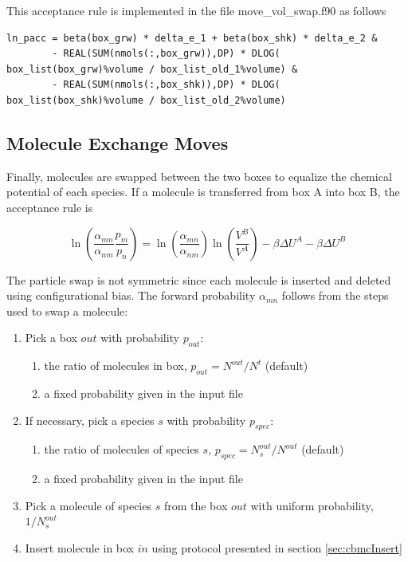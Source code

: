 This acceptance rule is implemented in the file move\_vol\_swap.f90 as follows

\begin{minipage}{\linewidth}
\begin{lstlisting}[firstnumber=402, caption=move\_vol\_swap.f90]
ln_pacc = beta(box_grw) * delta_e_1 + beta(box_shk) * delta_e_2 &
        - REAL(SUM(nmols(:,box_grw)),DP) * DLOG( box_list(box_grw)%volume / box_list_old_1%volume) &
        - REAL(SUM(nmols(:,box_shk)),DP) * DLOG( box_list(box_shk)%volume / box_list_old_2%volume)

\end{lstlisting}
\end{minipage}

\subsection{Molecule Exchange Moves} 
\label{sec:mol_swap}

Finally, molecules are swapped between the two boxes to equalize the chemical potential of each species.
If a molecule is transferred from box A into box B, the acceptance rule is

\begin{equation}
\ln \left( \frac{\alpha_{mn}}{\alpha_{nm}} \frac{p_m}{p_n} \right) = \ln \left( \frac{\alpha_{mn}}{\alpha_{nm}} \right)  \ln \left(\frac{V^B}{V^A}\right) -\beta \Delta U^A - \beta \Delta U^B
\label{eq:gemc_nvt_transfer}
\end{equation}

The particle swap is not symmetric since each molecule is inserted and deleted using configurational bias.
The forward probability $\alpha_{mn}$ follows from the steps used to swap a molecule:

\begin{enumerate}
\item Pick a box $out$ with probability $p_{out}$:
	\begin{enumerate}
	\item the ratio of molecules in box, $p_{out} = N^{out}/N^t$ (default)
   \item a fixed probability given in the input file
	\end{enumerate}
\item If necessary, pick a species $s$ with probability $p_{spec}$:
	\begin{enumerate}
	\item the ratio of molecules of species $s$, $p_{spec} = N^{out}_s/N^{out}$ (default)
   \item a fixed probability given in the input file
	\end{enumerate}
\item Pick a molecule of species $s$ from the box $out$ with uniform probability, $1/N^{out}_s$
\item Insert molecule in box $in$ using protocol presented in section \ref{sec:cbmcInsert}
\end{enumerate}

